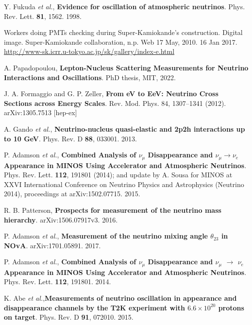  Y. Fukuda \textit{et al.}, \textbf{Evidence for oscillation of atmospheric neutrinos}. Phys. Rev. Lett. \textbf{81}, 1562. 1998.  

 Workers doing PMTs checking during Super-Kamiokande's construction. Digital image. Super-Kamiokande collaboration, n.p. Web 17 May, 2010. 16 Jan 2017. \href{http://www-sk.icrr.u-tokyo.ac.jp/sk/gallery/index-e.html}{http://www-sk.icrr.u-tokyo.ac.jp/sk/gallery/index-e.html}

 A. Papadopoulou, \textbf{Lepton-Nucleus Scattering Measurements for Neutrino Interactions and Oscillations}. PhD thesis, MIT, 2022. 

 J. A. Formaggio and G. P. Zeller, \textbf{From eV to EeV: Neutrino Cross Sections across Energy Scales}. Rev. Mod. Phys. 84, 1307–1341 (2012). arXiv:1305.7513 [hep-ex]

 A. Gando \textit{et al.}, \textbf{Neutrino-nucleus quasi-elastic and 2p2h interactions up to 10 GeV}. Phys. Rev. D \textbf{88}, 033001. 2013.

 P. Adamson \textit{et al.}, \textbf{Combined Analysis of $\nu_\mu$ Disappearance and $\nu_\mu \rightarrow \nu_e$ Appearance in MINOS Using Accelerator and Atmospheric Neutrinos}. Phys. Rev. Lett. \textbf{112}, 191801 (2014); and update by A. Sousa for MINOS at XXVI International
Conference on Neutrino Physics and Astrophysics (Neutrino 2014), proceedings at arXiv:1502.07715. 2015.

 R. B. Patterson, \textbf{Prospects for measurement of the neutrino mass hierarchy}. arXiv:1506.07917v3. 2016.

 P. Adamson \textit{et al.}, \textbf{Measurement of the neutrino mixing angle $\theta_{23}$ in NOvA}. arXiv:1701.05891. 2017.

 P. Adamson \textit{et al.}, \textbf{Combined Analysis of $\nu_\mu$ Disappearance and $\nu_\mu$ $\rightarrow $ $\nu_e$ Appearance in MINOS Using Accelerator and Atmospheric Neutrinos}. Phys. Rev. Lett. \textbf{112}, 191801. 2014.

 K. Abe \textit{et al.},\textbf{Measurements of neutrino oscillation in appearance and disappearance channels by the T2K experiment with $6.6 \times 10^{20} $ protons on target}. Phys. Rev. D \textbf{91}, 072010. 2015.

